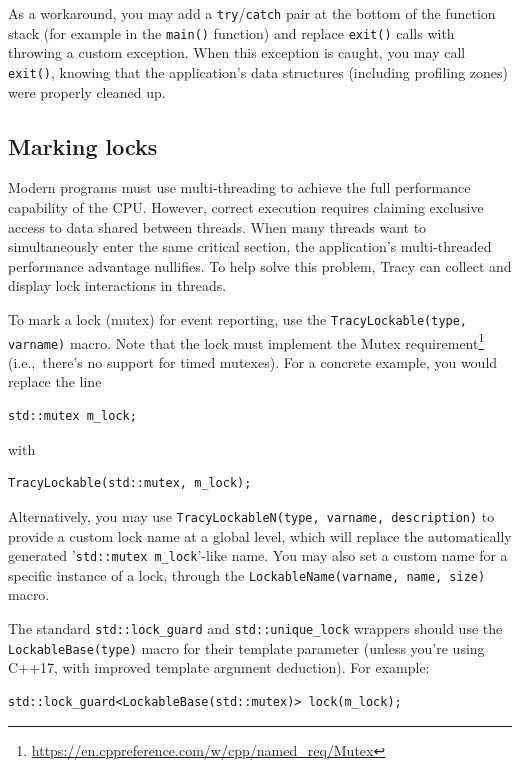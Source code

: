\documentclass[hidelinks,titlepage,a4paper,twoside]{article}
\begin{document}
As a workaround, you may add a \texttt{try}/\texttt{catch} pair at the bottom of the function stack (for example in the \texttt{main()} function) and replace \texttt{exit()} calls with throwing a custom exception. When this exception is caught, you may call \texttt{exit()}, knowing that the application's data structures (including profiling zones) were properly cleaned up.

\subsection{Marking locks}

Modern programs must use multi-threading to achieve the full performance capability of the CPU. However, correct execution requires claiming exclusive access to data shared between threads. When many threads want to simultaneously enter the same critical section, the application's multi-threaded performance advantage nullifies. To help solve this problem, Tracy can collect and display lock interactions in threads.

To mark a lock (mutex) for event reporting, use the \texttt{TracyLockable(type, varname)} macro. Note that the lock must implement the Mutex requirement\footnote{\url{https://en.cppreference.com/w/cpp/named_req/Mutex}} (i.e.,\ there's no support for timed mutexes). For a concrete example, you would replace the line

\begin{lstlisting}
std::mutex m_lock;
\end{lstlisting}

with

\begin{lstlisting}
TracyLockable(std::mutex, m_lock);
\end{lstlisting}

Alternatively, you may use \texttt{TracyLockableN(type, varname, description)} to provide a custom lock name at a global level, which will replace the automatically generated '\texttt{std::mutex m\_lock}'-like name. You may also set a custom name for a specific instance of a lock, through the \texttt{LockableName(varname, name, size)} macro.

The standard \texttt{std::lock\_guard} and \texttt{std::unique\_lock} wrappers should use the \texttt{LockableBase(type)} macro for their template parameter (unless you're using C++17, with improved template argument deduction). For example:

\begin{lstlisting}
std::lock_guard<LockableBase(std::mutex)> lock(m_lock);
\end{lstlisting}
\end{document}
